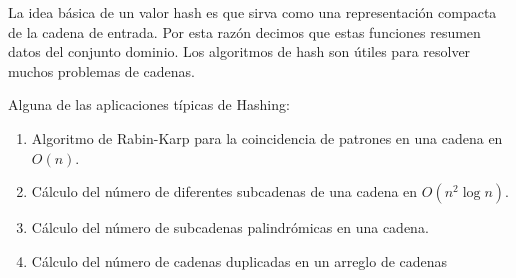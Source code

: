 La idea básica de un valor hash es que sirva como una representación compacta de la cadena de entrada. Por esta razón decimos que estas funciones resumen datos del conjunto dominio. Los algoritmos de hash son útiles para resolver muchos problemas de cadenas.

Alguna de las aplicaciones típicas de Hashing:

\begin{enumerate}
	\item Algoritmo de Rabin-Karp para la coincidencia de patrones en una cadena en $O(n)$.
	\item Cálculo del número de diferentes subcadenas de una cadena en $O(n^2 \log n)$.
	\item Cálculo del número de subcadenas palindrómicas en una cadena.
	\item Cálculo del número de cadenas duplicadas en un arreglo de cadenas
\end{enumerate}